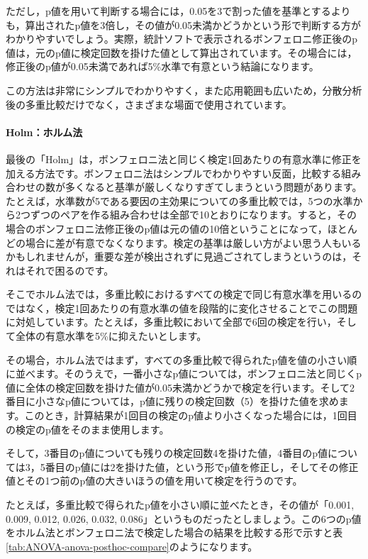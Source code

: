 \documentclass[
  12pt,
  a5jpaper,
  lualatex, ja=standard]{bxjsbook}
\begin{document}
ただし，p値を用いて判断する場合には，0.05を3で割った値を基準とするよりも，算出されたp値を3倍し，その値が0.05未満かどうかという形で判断する方がわかりやすいでしょう。実際，統計ソフトで表示されるボンフェロニ修正後のp値は，元のp値に検定回数を掛けた値として算出されています。その場合には，修正後のp値が0.05未満であれば5\%水準で有意という結論になります。

この方法は非常にシンプルでわかりやすく，また応用範囲も広いため，分散分析後の多重比較だけでなく，さまざまな場面で使用されています。

\hypertarget{subsub:ANOVA-anova-posthoc-holm}{%
\paragraph*{Holm：ホルム法}\label{subsub:ANOVA-anova-posthoc-holm}}

最後の「Holm」は，ボンフェロニ法と同じく検定1回あたりの有意水準に修正を加える方法です。ボンフェロニ法はシンプルでわかりやすい反面，比較する組み合わせの数が多くなると基準が厳しくなりすぎてしまうという問題があります。たとえば，水準数が5である要因の主効果についての多重比較では，5つの水準から2つずつのペアを作る組み合わせは全部で10とおりになります。すると，その場合のボンフェロニ法修正後のp値は元の値の10倍ということになって，ほとんどの場合に差が有意でなくなります。検定の基準は厳しい方がよい思う人もいるかもしれませんが，重要な差が検出されずに見過ごされてしまうというのは，それはそれで困るのです。

そこでホルム法では，多重比較におけるすべての検定で同じ有意水準を用いるのではなく，検定1回あたりの有意水準の値を段階的に変化させることでこの問題に対処しています。たとえば，多重比較において全部で6回の検定を行い，そして全体の有意水準を5\%に抑えたいとします。

その場合，ホルム法ではまず，すべての多重比較で得られたp値を値の小さい順に並べます。そのうえで，一番小さなp値については，ボンフェロニ法と同じくp値に全体の検定回数を掛けた値が0.05未満かどうかで検定を行います。そして2番目に小さなp値については，p値に残りの検定回数（5）を掛けた値を求めます。このとき，計算結果が1回目の検定のp値より小さくなった場合には，1回目の検定のp値をそのまま使用します。

そして，3番目のp値についても残りの検定回数4を掛けた値，4番目のp値については3，5番目のp値には2を掛けた値，という形でp値を修正し，そしてその修正値とその1つ前のp値の大きいほうの値を用いて検定を行うのです。

たとえば，多重比較で得られたp値を小さい順に並べたとき，その値が「0.001, 0.009, 0.012, 0.026, 0.032, 0.086」というものだったとしましょう。この6つのp値をホルム法とボンフェロニ法で検定した場合の結果を比較する形で示すと表\ref{tab:ANOVA-anova-posthoc-compare}のようになります。
\end{document}
